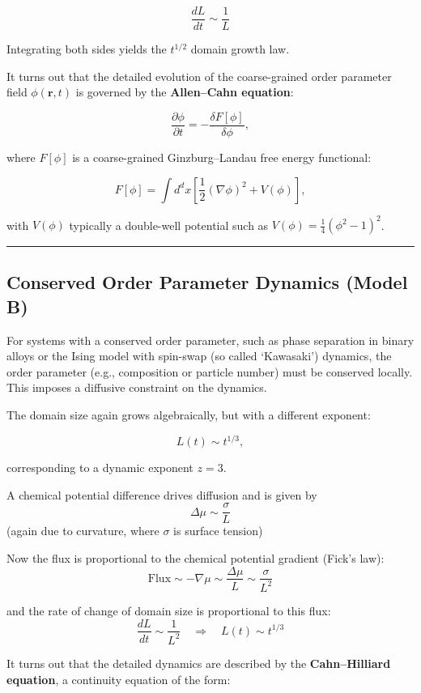 \documentclass[
  letterpaper,
  enabledeprecatedfontcommands]{report}
\begin{document}
\[
  \frac{dL}{dt} \sim \frac{1}{L}
  \]

Integrating both sides yields the \(t^{1/2}\) domain growth law.

It turns out that the detailed evolution of the coarse-grained order
parameter field \(\phi(\mathbf{r}, t)\) is governed by the
\textbf{Allen--Cahn equation}:

\[
\frac{\partial \phi}{\partial t} = - \frac{\delta F[\phi]}{\delta \phi},
\]

where \(F[\phi]\) is a coarse-grained Ginzburg--Landau free energy
functional:

\[
F[\phi] = \int d^d x \left[ \frac{1}{2} (\nabla \phi)^2 + V(\phi) \right],
\]

with \(V(\phi)\) typically a double-well potential such as
\(V(\phi) = \frac{1}{4}(\phi^2 - 1)^2\).

\begin{center}\rule{0.5\linewidth}{0.5pt}\end{center}

\subsection{Conserved Order Parameter Dynamics (Model
B)}\label{conserved-order-parameter-dynamics-model-b}

For systems with a conserved order parameter, such as phase separation
in binary alloys or the Ising model with spin-swap (so called
`Kawasaki') dynamics, the order parameter (e.g., composition or particle
number) must be conserved locally. This imposes a diffusive constraint
on the dynamics.

The domain size again grows algebraically, but with a different
exponent:

\[
L(t) \sim t^{1/3},
\]

corresponding to a dynamic exponent \(z = 3\).

A chemical potential difference drives diffusion and is given by \[
\Delta \mu \sim \frac{\sigma}{L}
\] (again due to curvature, where \(\sigma\) is surface tension)

Now the flux is proportional to the chemical potential gradient (Fick's
law): \[
\text{Flux} \sim -\nabla \mu \sim \frac{\Delta \mu}{L} \sim \frac{\sigma}{L^2}
\]

and the rate of change of domain size is proportional to this flux: \[
\frac{dL}{dt} \sim \frac{1}{L^2}
\quad\Rightarrow\quad
L(t) \sim t^{1/3}
\]

It turns out that the detailed dynamics are described by the
\textbf{Cahn--Hilliard equation}, a continuity equation of the form:
\end{document}
